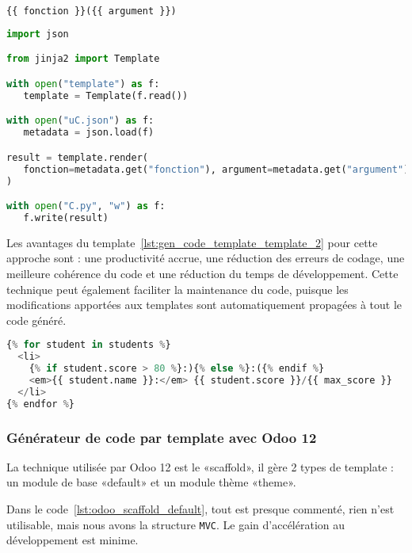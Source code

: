\begin{lstlisting}[language=Python, upquote=true, caption={template - fichier template}, label={lst:gen_code_template_template}]
{{ fonction }}({{ argument }})
\end{lstlisting}

\begin{lstlisting}[language=Python, upquote=true, caption={M(µ$_C$)}, label={lst:gen_code_template_m}]
import json

from jinja2 import Template

with open("template") as f:
   template = Template(f.read())

with open("uC.json") as f:
   metadata = json.load(f)

result = template.render(
   fonction=metadata.get("fonction"), argument=metadata.get("argument")
)

with open("C.py", "w") as f:
   f.write(result)
\end{lstlisting}

Les avantages du template~\ref{lst:gen_code_template_template_2} pour cette approche sont : une productivité accrue, une réduction des erreurs de codage, une meilleure cohérence du code et une réduction du temps de développement. Cette technique peut également faciliter la maintenance du code, puisque les modifications apportées aux templates sont automatiquement propagées à tout le code généré.

\begin{lstlisting}[language=Python, upquote=true, caption={Exemple de template avec logique}, label={lst:gen_code_template_template_2}]
{% for student in students %}
  <li>
	{% if student.score > 80 %}:){% else %}:({% endif %}
	<em>{{ student.name }}:</em> {{ student.score }}/{{ max_score }}
  </li>
{% endfor %}
\end{lstlisting}

\subsubsection{Générateur de code par template avec Odoo 12}

La technique utilisée par Odoo 12 est le «scaffold», il gère 2 types de template : un module de base «default» et un module thème «theme».

Dans le code~\ref{lst:odoo_scaffold_default}, tout est presque commenté, rien n’est utilisable, mais nous avons la structure \texttt{MVC}. Le gain d’accélération au développement est minime.

